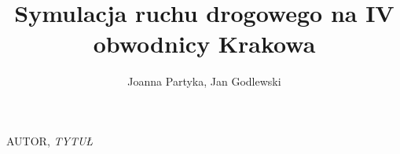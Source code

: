 \documentclass[a4paper,12pt]{article}
\title{Symulacja ruchu drogowego na IV obwodnicy Krakowa}
\author{Joanna Partyka, Jan Godlewski}
\date{}
\begin{document}
	\maketitle

	\pagebreak
	\begin{thebibliography}{15}
		
		AUTOR, \textit{TYTUŁ}
		
	\end{thebibliography}
	
\end{document}
